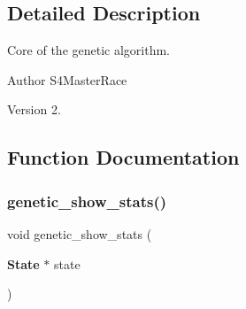 \subsection{Detailed Description}
Core of the genetic algorithm. 

\begin{DoxyAuthor}{Author}
S4\+Master\+Race 
\end{DoxyAuthor}
\begin{DoxyVersion}{Version}
2. 
\end{DoxyVersion}


\subsection{Function Documentation}
\mbox{\label{core_8h_a471131fbd6fb873da1e9e9e34866f35b}} 
\subsubsection{genetic\+\_\+show\+\_\+stats()}
{\footnotesize\ttfamily void genetic\+\_\+show\+\_\+stats (\begin{DoxyParamCaption}\item[{\textbf{ State} $\ast$}]{state }\end{DoxyParamCaption})}

